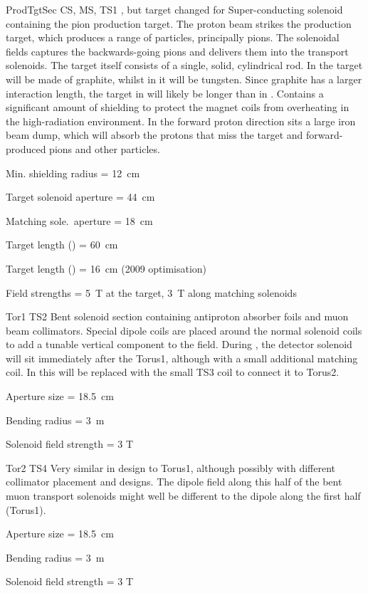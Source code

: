 {ProdTgtSec}
{CS, MS, TS1}
{\phaseI, but target changed for \phaseII}
{Super-conducting solenoid containing the pion production target.
  The proton beam strikes the production target, which produces a range of particles, principally pions.
  The solenoidal fields captures the backwards-going pions and delivers them into the transport solenoids.
  The target itself consists of a single, solid, cylindrical rod.
  In \phaseI the target will be made of graphite, whilst in \phaseII it will be tungsten.
 Since graphite has a larger interaction length, the target in \phaseI will likely be longer than in \phaseII.
  Contains a significant amount of shielding to protect the magnet coils from overheating in the high-radiation environment.
In the forward proton direction sits a large iron beam dump, which will absorb the protons that miss the target and forward-produced pions and other particles.
}
{\item Min. shielding radius = 12~cm%
 \item Target solenoid aperture = 44~cm%
 \item Matching sole.\ aperture = 18~cm%
 \item Target length (\phaseI) = 60~cm%
 \item Target length (\phaseII) = 16~cm (2009 optimisation)%
 \item Field strengths = 5~T at the target, 3~T along matching solenoids}

{Tor1}
{TS2}
{\phaseI }
{Bent solenoid section containing antiproton absorber foils and muon beam collimators.  Special dipole coils are placed around the normal solenoid coils to add a tunable vertical component to the field.  During \phaseI, the detector solenoid will sit immediately after the Torus1, although with a small additional matching coil.  In \phaseII this will be replaced with the small TS3 coil to connect it to Torus2.}
{\item Aperture size = 18.5~cm
 \item Bending radius = 3~m 
\item Solenoid field strength = 3 T}

{Tor2}
{TS4}
{\phaseII}
{Very similar in design to Torus1, although possibly with different collimator placement and designs. The dipole field along this half of the bent muon transport solenoids might well be different to the dipole along the first half (Torus1).}
{\item Aperture size = 18.5~cm
 \item Bending radius = 3~m
\item Solenoid field strength = 3 T}

